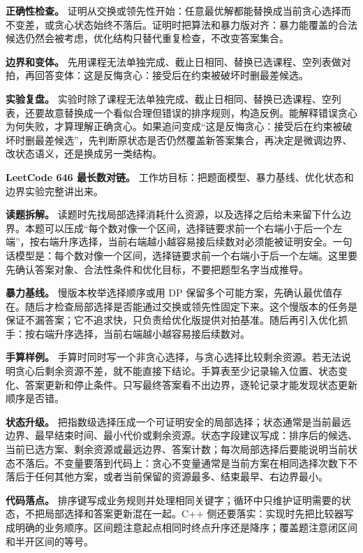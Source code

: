 \textbf{正确性检查。} 证明从交换或领先性开始：任意最优解都能替换成当前贪心选择而不变差，或贪心状态始终不落后。证明时把算法和暴力版对齐：暴力能覆盖的合法候选仍然会被考虑，优化结构只替代重复检查，不改变答案集合。

\textbf{边界和变体。} 先用课程无法单独完成、截止日相同、替换已选课程、空列表做对拍，再回答变体：这是反悔贪心：接受后在约束被破坏时删最差候选。

\textbf{实验复盘。} 实验时除了课程无法单独完成、截止日相同、替换已选课程、空列表，还要故意替换成一个看似合理但错误的排序规则，构造反例。能解释错误贪心为何失败，才算理解正确贪心。如果追问变成“这是反悔贪心：接受后在约束被破坏时删最差候选”，先判断原状态是否仍然覆盖新答案集合，再决定是微调边界、改状态语义，还是换成另一类结构。

\noindent\textbf{LeetCode 646 最长数对链。} 工作坊目标：把题面模型、暴力基线、优化状态和边界实验完整讲出来。

\textbf{读题拆解。} 读题时先找局部选择消耗什么资源，以及选择之后给未来留下什么边界。本题可以压成“每个数对像一个区间，选择链要求前一个右端小于后一个左端”，按右端升序选择，当前右端越小越容易接后续数对必须能被证明安全。一句话模型是：每个数对像一个区间，选择链要求前一个右端小于后一个左端。这里要先确认答案对象、合法性条件和优化目标，不要把题型名字当成推导。

\textbf{暴力基线。} 慢版本枚举选择顺序或用 DP 保留多个可能方案，先确认最优值存在。随后才检查局部选择是否能通过交换或领先性固定下来。这个慢版本的任务是保证不漏答案；它不追求快，只负责给优化版提供对拍基准。随后再引入优化抓手：按右端升序选择，当前右端越小越容易接后续数对。

\textbf{手算样例。} 手算时同时写一个非贪心选择，与贪心选择比较剩余资源。若无法说明贪心后剩余资源不差，就不能直接下结论。手算表至少记录输入位置、状态变化、答案更新和停止条件。只写最终答案看不出边界，逐轮记录才能发现状态更新顺序是否错。

\textbf{状态升级。} 把指数级选择压成一个可证明安全的局部选择；状态通常是当前最远边界、最早结束时间、最小代价或剩余资源。状态字段建议写成：排序后的候选、当前已选方案、剩余资源或最远边界、答案计数；每次局部选择后要能说明当前状态不落后。不变量要落到代码上：贪心不变量通常是当前方案在相同选择次数下不落后于任何其他方案，或者当前保留的资源最多、结束最早、右边界最小。

\textbf{代码落点。} 排序键写成业务规则并处理相同关键字；循环中只维护证明需要的状态，不把局部选择和答案更新混在一起。C++ 侧还要落实：实现时先把比较器写成明确的业务顺序。区间题注意起点相同时终点升序还是降序；覆盖题注意闭区间和半开区间的等号。

